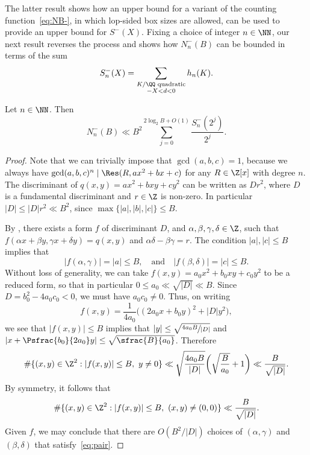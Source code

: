 The latter result shows how an upper bound for a variant of the counting function~\eqref{eq:NB-},
in which lop-sided box sizes are allowed, can be used to provide an upper bound for $S^-(X)$.
Fixing a choice of integer $n\in \NN$,
our next result reverses the process and shows how
$N_n^-(B)$ can be bounded in terms of the sum
\[
S_n^-(X)=
\sum_{
\substack{K/\QQ \text{ quadratic}\\
-X<d<0
}} h_n(K).
\]

\begin{lemma}
Let $n\in \NN$. Then
\[
N_n^-(B)\ll
B^2 \sum_{j=0}^{2\log_2 B+O(1)}
\frac{S_n^-(2^j)}{2^j}.
\]
\end{lemma}

\begin{proof}
Note that we can trivially impose that $\gcd(a,b,c)=1$, because we always have $\gcd(a,b,c)^n\mid \Res(R,ax^2+bx+c)$ for any $R\in\Z[x]$ with degree $n$.
The discriminant of $q(x,y)=ax^2+bxy+cy^2$ can be written as $Dr^2$, where $D$ is a fundamental discriminant and $r\in\Z$ is non-zero.
In particular $|D|\leq |D|r^2\ll B^2$, since $\max\{|a|,|b|,|c|\}\leq B$.

By \cite[Prop.\,7.1]{Buell}, there exists a form $f$ of discriminant $D$, and $\alpha,\beta,\gamma,\delta \in\Z$, such that $f(\alpha x+\beta y,\gamma x+\delta y)=q(x,y)$ and $\alpha\delta-\beta\gamma=r$.
The condition $|a|,|c|\leq B$ implies that
\begin{equation}\label{eq:pair}
|f(\alpha ,\gamma )|=|a|\leq B, \quad\text{and}\quad |f(\beta ,\delta )|=|c|\leq B.
\end{equation}
Without loss of generality, we can take $f(x,y)=a_0x^2+b_0xy+c_0y^2$ to be a reduced form, so that in particular $0\leq a_0\ll \sqrt{|D|}\ll B$. Since $D=b_0^2-4a_0c_0<0$, we must have $a_0c_0\neq0$. Thus, on writing
\[
f(x,y)=\frac{1}{4a_0}\bigl((2a_0x+b_0y)^2+|D|y^2\bigr),
\]
we see that $|f(x ,y)|\leq B$ implies that $|y|\leq\sqrt{ \sfrac{4a_0B}{|D|}}$ and $|x+\Psfrac{b_0}{2a_0}y|\leq \sqrt{\sfrac{B}{a_0}}$. Therefore
\[
\#\{(x,y)\in\Z^2: |f(x,y)|\leq B,\ y\neq 0\}\ll \sqrt{ \frac{4a_0B}{|D|}}\biggl( \sqrt{\frac{B}{a_0}}+1\biggr)\ll \frac{B}{\sqrt{|D|}}.
\]
By symmetry, it follows that
\[
\#\{(x,y)\in\Z^2: |f(x,y)|\leq B,\ (x,y)\neq (0,0)\}\ll \frac{B}{\sqrt{|D|}}.
\]
Given $f$, we may conclude that there are $O(B^2/|D|)$
choices of $(\alpha ,\gamma )$ and $(\beta ,\delta )$ that satisfy~\eqref{eq:pair}.


\end{proof}
